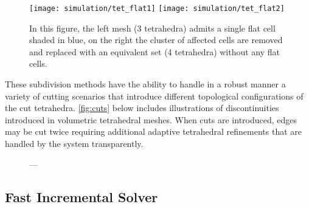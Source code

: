 \begin{figure}
  \centering%
  \texttt{[image: simulation/tet\_flat1]}\label{fig:tet_flat1}
  \hspace{10ex}
  \texttt{[image: simulation/tet\_flat2]}\label{fig:tet_flat2}
  \caption{In this figure, the left mesh (3 tetrahedra) admits a single flat cell shaded in blue, on the right the cluster of affected cells are removed and replaced with an equivalent set (4 tetrahedra) without any flat cells.}\label{fig:flat_tet}
\end{figure}



These subdivision methods have the ability to handle in a robust manner a variety of cutting scenarios that introduce different topological configurations of the cut tetrahedra. \autoref{fig:cuts} below includes illustrations of discontinuities introduced in volumetric tetrahedral meshes.  When cuts are introduced, edges may be cut twice requiring additional adaptive tetrahedral refinements that are handled by the system transparently.

\begin{figure}
  \centering%
  \setlength{\fboxsep}{0pt}%
  \setlength{\fboxrule}{0.1pt}%
  \hfill%
  \hfill%
  \caption{---}\label{fig:cuts}
\end{figure}


\clearpage
\subsection{Fast Incremental Solver}\label{ssec:incremental_solver}

